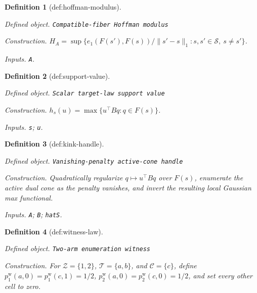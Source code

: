 \documentclass{article}
\newtheorem{definition}{Definition}
\begin{document}
\begin{definition}[def:hoffman-modulus]\label{def:hoffman-modulus}
\par\smallskip\noindent\emph{Defined object.} \texttt{Compatible-\allowbreak{}fiber Hoffman modulus}
\par\smallskip\noindent\emph{Construction.} \(H_A=\sup\{e_1(F(s'),F(s))/\|s'-s\|_1:s,s'\in\mathcal S,\ s\ne s'\}\).
\par\smallskip\noindent\emph{Inputs.} \texttt{A}.
\end{definition}

\begin{definition}[def:support-value]\label{def:support-value}
\par\smallskip\noindent\emph{Defined object.} \texttt{Scalar target-\allowbreak{}law support value}
\par\smallskip\noindent\emph{Construction.} \(h_s(u)=\max\{u^\top Bq:q\in F(s)\}\).
\par\smallskip\noindent\emph{Inputs.} \texttt{s}; \texttt{u}.
\end{definition}

\begin{definition}[def:kink-handle]\label{def:kink-handle}
\par\smallskip\noindent\emph{Defined object.} \texttt{Vanishing-\allowbreak{}penalty active-\allowbreak{}cone handle}
\par\smallskip\noindent\emph{Construction.} Quadratically regularize \(q\mapsto u^\top Bq\) over \(F(s)\), enumerate the active dual cone as the penalty vanishes, and invert the resulting local Gaussian max functional.
\par\smallskip\noindent\emph{Inputs.} \texttt{A}; \texttt{B}; \texttt{hatS}.
\end{definition}

\begin{definition}[def:witness-law]\label{def:witness-law}
\par\smallskip\noindent\emph{Defined object.} \texttt{Two-\allowbreak{}arm enumeration witness}
\par\smallskip\noindent\emph{Construction.} For \(\mathcal Z=\{1,2\}\), \(\mathcal T=\{a,b\}\), and \(\mathcal C=\{c\}\), define \(p^{\mathrm w}_1(a,0)=p^{\mathrm w}_1(c,1)=1/2\), \(p^{\mathrm w}_2(a,0)=p^{\mathrm w}_2(c,0)=1/2\), and set every other cell to zero.
\end{definition}
\end{document}
